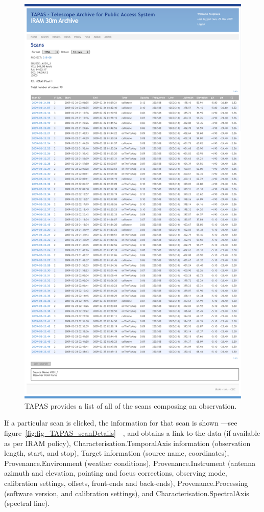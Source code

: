 			\begin{figure}[tbp]
				\centering
					\includegraphics[totalheight=\textheight]
					{fig/TAPAS_scansPerObservation.pdf}
				\caption[TAPAS observation scans]
				{TAPAS provides a list of all of the scans
				composing an observation.}
				\label{fig:fig_TAPAS_scansPerObservation}
			\end{figure}
			
			If a particular scan is clicked, the information
			for that scan is shown ---see
			figure~\ref{fig:fig_TAPAS_scanDetails}---, and
			obtains a link to the data (if available as per
			IRAM policy), Characterisation.TemporalAxis
			information (observation length, start, and stop),
			Target information (source name, coordinates),
			Provenance.Environment (weather conditions),
			Provenance.Instrument (antenna azimuth and elevation,
			pointing and focus corrections, observing mode,
			calibration settings, offsets, front-ends and back-ends), 
			Provenance.Processing (software version, and calibration
			settings), and Characterisation.SpectralAxis (spectral
			line).
			
